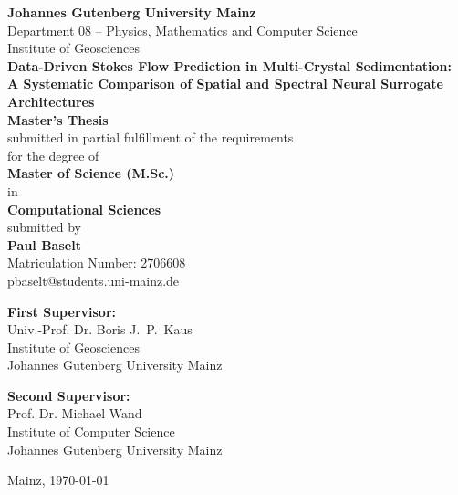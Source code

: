 \begin{titlepage}
    \centering
    
    
    {\large \textbf{Johannes Gutenberg University Mainz}}\\[0.5cm]
    {\large Department 08 -- Physics, Mathematics and Computer Science}\\[0.5cm]
    {\large Institute of Geosciences}\\[2cm]
    
    
    {\huge \textbf{Data-Driven Stokes Flow Prediction in Multi-Crystal Sedimentation: }}\\[0.5cm]
    {\LARGE \textbf{A Systematic Comparison of Spatial and Spectral Neural Surrogate Architectures}}\\[1.5cm]
    
    {\Large \textbf{Master's Thesis}}\\[0.5cm]
    submitted in partial fulfillment of the requirements\\[0.3cm]
    for the degree of\\[0.3cm]
    {\large \textbf{Master of Science (M.Sc.)}}\\[0.3cm]
    in\\[0.3cm]
    {\large \textbf{Computational Sciences}}\\[1cm]
    
    submitted by\\[0.5cm]
    {\large \textbf{Paul Baselt}}\\[0.3cm]
    Matriculation Number: 2706608\\[0.3cm]
    pbaselt@students.uni-mainz.de\\[1.5cm]
    
    \begin{minipage}[t]{0.45\textwidth}
        \centering
        \textbf{First Supervisor:}\\
        Univ.-Prof. Dr. Boris J.\ P.\ Kaus\\
        Institute of Geosciences\\
        Johannes Gutenberg University Mainz
    \end{minipage}
    \hfill
    \begin{minipage}[t]{0.45\textwidth}
        \centering
        \textbf{Second Supervisor:}\\
        Prof. Dr. Michael Wand\\
        Institute of Computer Science\\
        Johannes Gutenberg University Mainz
    \end{minipage}
    
    \vfill
    {\large Mainz, \today}
    
\end{titlepage}
